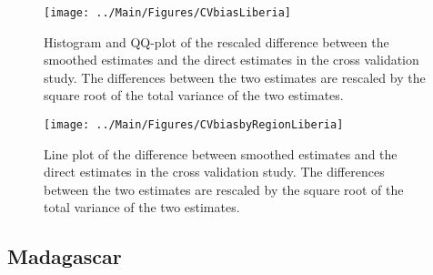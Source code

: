 \documentclass[12pt]{article}\usepackage[]{graphicx}\usepackage[]{color}
\newenvironment{knitrout}{}{} %
\begin{document}
\begin{knitrout}
\color{fgcolor}\begin{figure}[bht]

{\centering \texttt{[image: ../Main/Figures/CVbiasLiberia]} 

}

\caption[Histogram and QQ-plot of the rescaled difference between the smoothed estimates and the direct estimates in the cross validation study]{Histogram and QQ-plot of the rescaled difference between the smoothed estimates and the direct estimates in the cross validation study. The differences between the two estimates are rescaled by the square root of the total variance of the two estimates.}\label{fig:unnamed-chunk-189}
\end{figure}


\end{knitrout}

\begin{knitrout}
\color{fgcolor}\begin{figure}[bht]

{\centering \texttt{[image: ../Main/Figures/CVbiasbyRegionLiberia]} 

}

\caption[Line plot of the difference between smoothed estimates and the direct estimates in the cross validation study]{Line plot of the difference between smoothed estimates and the direct estimates in the cross validation study. The differences between the two estimates are rescaled by the square root of the total variance of the two estimates.}\label{fig:unnamed-chunk-190}
\end{figure}


\end{knitrout}


\clearpage
\subsection{Madagascar}


\end{document}
